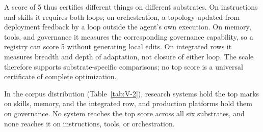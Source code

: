 A score of 5 thus certifies different things on different substrates. On instructions and skills it requires both loops; on orchestration, a topology updated from deployment feedback by a loop outside the agent's own execution. On memory, tools, and governance it measures the corresponding governance capability, so a registry can score 5 without generating local edits. On integrated rows it measures breadth and depth of adaptation, not closure of either loop. The scale therefore supports substrate-specific comparisons; no top score is a universal certificate of complete optimization.

In the corpus distribution (Table~\ref{tab:V-2}), research systems hold the top marks on skills, memory, and the integrated row, and production platforms hold them on governance. No system reaches the top score across all six substrates, and none reaches it on instructions, tools, or orchestration.

